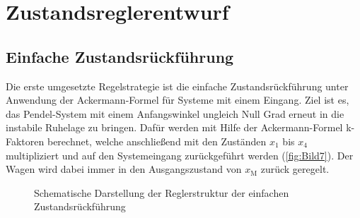 \section{Zustandsreglerentwurf} \label{sec:Zustandsreglerentwurf}

\subsection{Einfache Zustandsrückführung} \label{sec:Ackermann-Formel}

Die erste umgesetzte Regelstrategie ist die einfache Zustandsrückführung unter Anwendung der Ackermann-Formel für Systeme mit einem Eingang. Ziel ist es, das Pendel-System mit einem Anfangswinkel ungleich Null Grad erneut in die instabile Ruhelage zu bringen. Dafür werden mit Hilfe der Ackermann-Formel k-Faktoren berechnet, welche anschließend mit den Zuständen $x_{\mathrm{1}}$ bis $x_{\mathrm{4}}$ multipliziert und auf den Systemeingang zurückgeführt werden (\autoref{fig:Bild7}). Der Wagen wird dabei immer in den Ausgangszustand von $x_{\mathrm{M}}$ zurück geregelt.

\begin{figure}[H]
    \centering
    \caption[Reglerstruktur einfache Zustandsrückführung]{Schematische Darstellung der Reglerstruktur der einfachen Zustandsrückführung}
    \label{fig:Bild7}
\end{figure}

